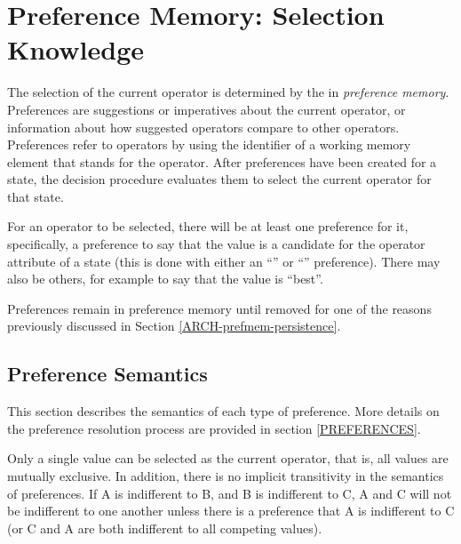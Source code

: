 \section{Preference Memory: Selection Knowledge} 
\label{ARCH-prefmem}

The selection of the current operator is determined by the  in \emph{preference memory}. Preferences are suggestions or imperatives about the current operator, or information about how suggested operators compare to other operators.  Preferences refer to operators by using the identifier of a working memory element that stands for the operator. After preferences have been created for a state, the decision procedure evaluates them to select the current operator for that state.

For an operator to be selected, there will be at least one preference for it, specifically, a preference to say that the value is a candidate for the operator attribute of a state (this is done with either an ``'' or ``'' preference). There may also be others, for example to say that the value is ``best''.

Preferences remain in preference memory until removed for one of the reasons previously discussed in Section \ref{ARCH-prefmem-persistence}.

\subsection{Preference Semantics}
\label{ARCH-prefmem-semantics}

This section describes the semantics of each type of preference.  More details on the preference resolution process are provided in section \ref{PREFERENCES}.


Only a single value can be selected as the current operator, that is, all values are mutually exclusive.  In addition, there is no implicit transitivity in the semantics of preferences.  If A is indifferent to B, and B is indifferent to C, A and C will not be indifferent to one another unless there is a preference that A is indifferent to C (or C and A are both indifferent to all competing values).

